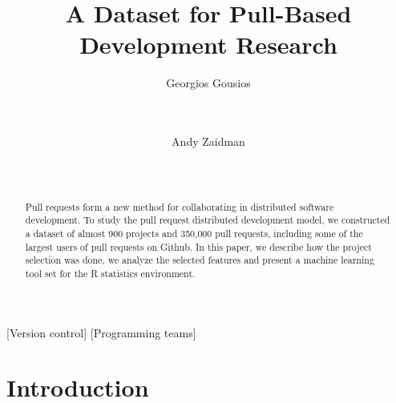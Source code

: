 \documentclass{sig-alternate}
\begin{document}
\newcommand{\todo}[1]{\textbf{TODO}\footnote{\textbf{TODO:} #1}}

\newcommand{\ghtorrent}{\textsc{ght}orrent\xspace}
\newcommand{\api}{\textsc{api}\xspace}
\newcommand{\pullreqs}{\textsf{pullreqs}\xspace}

\title{A Dataset for Pull-Based Development Research}

\author{
\alignauthor
Georgios Gousios\\
       \\
       \\
\and
Andy Zaidman\\
       \\
       \\
}

\maketitle

\begin{abstract}

Pull requests form a new method for collaborating in distributed software
development. To study the pull request distributed development model, we
constructed a dataset of almost 900 projects and 350,000 pull requests,
including some of the largest users of pull requests on Github. In this paper,
we describe how the project selection was done, we analyze the selected features
and present a machine learning tool set for the R statistics environment. 

\end{abstract}

[Version control]
[Programming teams]



\section{Introduction}
\label{sec:intro}
\end{document}
